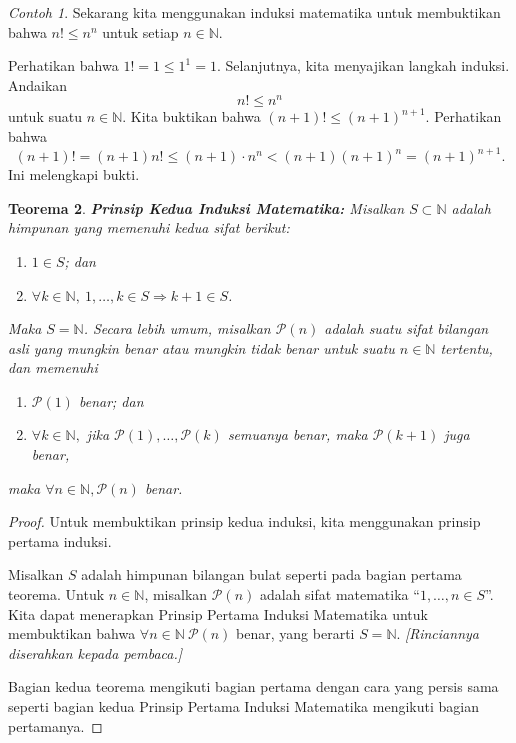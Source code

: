 \documentclass[12pt,letterpaper]{amsbook}
\newtheorem{theorem}{Teorema}[section]
\theoremstyle{definition}
\theoremstyle{remark}
\newtheorem{example}[theorem]{Contoh}
\numberwithin{figure}{section}
\numberwithin{exercise}{section}
\numberwithin{section}{chapter}
\numberwithin{equation}{section}
\numberwithin{table}{section}
\newcommand{\NN}{{\mathbb N}}
\newcommand{\Pp}{{\mathcal P}}
\begin{document}
\begin{example}\label{eg:inductionv1b}
Sekarang kita menggunakan induksi matematika untuk membuktikan bahwa
$n!\leq n^n$ untuk setiap $n\in\NN$.
\par Perhatikan bahwa $1!=1\leq 1^1=1$. Selanjutnya, kita menyajikan langkah
induksi. Andaikan
\begin{equation*}
n!\leq n^n
\end{equation*}
untuk suatu $n\in\NN$. Kita buktikan bahwa $(n+1)!\leq (n+1)^{n+1}$.
Perhatikan bahwa
\begin{equation*}
(n+1)!=(n+1)n!\leq (n+1)\cdot n^n<(n+1)(n+1)^{n}=(n+1)^{n+1}.
\end{equation*}
Ini melengkapi bukti.
\end{example}

\begin{theorem}
\textbf{Prinsip Kedua Induksi Matematika:}
Misalkan $S\subset\NN$ adalah himpunan yang memenuhi kedua sifat berikut:
\begin{enumerate}
\item $1\in S$; dan
\item $\forall k\in\NN,\ 1,\dots,k\in S\Rightarrow k+1\in S$.
\end{enumerate}
Maka $S=\NN$.\newline
Secara lebih umum, misalkan $\Pp(n)$ adalah suatu sifat bilangan asli yang
mungkin benar atau mungkin tidak benar untuk suatu $n\in\NN$ tertentu, dan
memenuhi
\begin{enumerate}
\item $\Pp(1)$ benar; dan
\item $\forall k\in\NN,$ jika $\Pp(1),\dots,\Pp(k)$ semuanya benar, maka
$\Pp(k+1)$ juga benar,
\end{enumerate}
maka $\forall n\in\NN, \Pp(n)$ benar.
\end{theorem}
\begin{proof}
Untuk membuktikan prinsip kedua induksi, kita menggunakan prinsip pertama
induksi.

Misalkan $S$ adalah himpunan bilangan bulat seperti pada bagian pertama
teorema. Untuk $n\in\NN$, misalkan $\Pp(n)$ adalah sifat matematika
``$1,\dots,n\in S$''. Kita dapat menerapkan Prinsip Pertama Induksi Matematika
untuk membuktikan bahwa $\forall n\in\NN\ \Pp(n)$ benar, yang berarti
$S=\NN$. {\it [Rinciannya diserahkan kepada pembaca.]}

Bagian kedua teorema mengikuti bagian pertama dengan cara yang persis sama
seperti bagian kedua Prinsip Pertama Induksi Matematika mengikuti bagian
pertamanya.
\end{proof}
\end{document}
